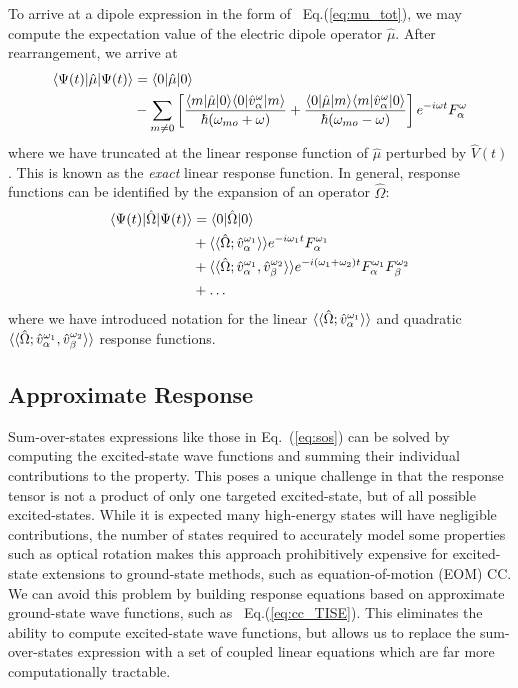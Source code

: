 {{{To arrive at a dipole expression in the form of ~Eq.(\ref{eq:mu_tot}), we may compute the expectation 
value of the electric dipole operator $\hat{\mu}$. After rearrangement, we arrive at
\begin{equation} \label{eq:sos}
    \begin{aligned}
    \langle\Psi(t) |\hat\mu| \Psi(t) \rangle &= \langle0 |\hat\mu| 0 \rangle \\ 
    &- \sum_{m\neq0}\left[\frac{\langle m |\hat\mu| 0 \rangle\langle0 |\hat{v}^\omega_\alpha| m \rangle}{\hbar(\omega_{mo}+\omega)}
        + \frac{\langle0 |\hat\mu| m \rangle\langle m |\hat{v}^\omega_\alpha| 0 \rangle}{\hbar(\omega_{mo}-\omega)}\right]
    e^{-i\omega t}F^\omega_\alpha
    \end{aligned}
\end{equation}
where we have truncated at the linear response function of $\hat{\mu}$ perturbed by $\hat{V}(t)$. This is known as the \textit{exact} linear response function. In general, 
response functions can be identified by the expansion of an operator $\hat\Omega$:
\begin{equation}
    \begin{aligned}
    \langle\Psi(t) |\hat\Omega| \Psi(t) \rangle &= \langle0 |\hat\Omega| 0 \rangle \\ 
    &+ \langle\langle\hat\Omega;\hat{v}^{\omega_1}_\alpha\rangle\rangle e^{-i\omega_1 t}F^{\omega_1}_\alpha \\ 
    &+ \langle\langle\hat\Omega;\hat{v}^{\omega_1}_\alpha,\hat{v}^{\omega_2}_\beta\rangle\rangle e^{-i(\omega_1+\omega_2)t}F^{\omega_1}_\alpha F^{\omega_2}_\beta \\
    &+ \ldots
    \end{aligned}
\end{equation}
where we have introduced notation for the linear $\langle\langle\hat\Omega;\hat{v}^{\omega_1}_\alpha\rangle\rangle$ 
and quadratic $\langle\langle\hat\Omega;\hat{v}^{\omega_1}_\alpha,\hat{v}^{\omega_2}_\beta\rangle\rangle$ response functions.

\subsection{Approximate Response} \label{ss:apprx} Sum-over-states expressions
like those in Eq.~(\ref{eq:sos}) can be solved by computing the excited-state
wave functions and summing their individual contributions to the property. This
poses a unique challenge in that the response tensor is not a product of only
one targeted excited-state, but of all possible excited-states.  While it is
expected many high-energy states will have negligible contributions, the number
of states required to accurately model some properties such as optical rotation
makes this approach prohibitively expensive for excited-state extensions to
ground-state methods, such as equation-of-motion (EOM) CC.\cite{Wiberg2006}  
We can avoid this
problem by building response equations based on approximate ground-state wave
functions, such as ~Eq.(\ref{eq:cc_TISE}).  This eliminates the ability to
compute excited-state wave functions, but allows us to replace the
sum-over-states expression with a set of coupled linear equations which are far
more computationally tractable.\cite{Norman2011,Helgaker2012}

}}}
